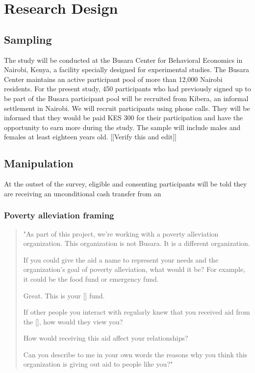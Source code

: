 \documentclass[11pt, a4paper]{article}\usepackage[]{graphicx}\usepackage[]{color}
\begin{document}
\section{Research Design}

    \subsection{Sampling}

        The study will be conducted at the Busara Center for Behavioral Economics in Nairobi, Kenya, a facility specially designed for experimental studies. The Busara Center maintains an active participant pool of more than 12,000 Nairobi residents. For the present study, 450 participants who had previously signed up to be part of the Busara participant pool will be recruited from Kibera, an informal settlement in Nairobi. We will recruit participants using phone calls. They will be informed that they would be paid KES 300 for their participation and have the opportunity to earn more during the study. The sample will include males and females at least eighteen years old. [[Verify this and edit]]

    \subsection{Manipulation}

        At the outset of the survey, eligible and consenting participants will be told they are receiving an unconditional cash transfer from an

        \subsubsection{Poverty alleviation framing}

            \begin{quote}

                "As part of this project, we're working with a poverty alleviation organization. This organization is not Busara. It is a different organization.

                If you could give the aid a name to represent your needs and the organization's goal of poverty alleviation, what would it be? For example, it could be the food fund or emergency fund.

                Great. This is your [] fund.

                If other people you interact with regularly knew that you received aid from the [], how would they view you?

                How would receiving this aid affect your relationships?

                Can you describe to me in your own words the reasons why you think this organization is giving out aid to people like you?"

            \end{quote}
\end{document}

